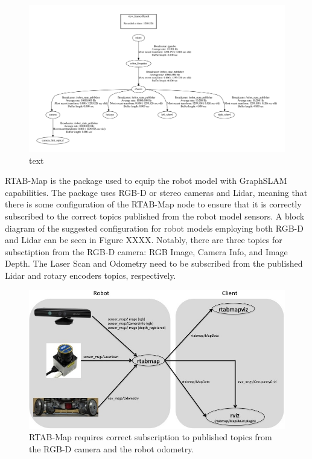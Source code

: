 \documentclass[a4paper]{article}
\begin{document}
\clearpage

\begin{figure}
	\centering
	\includegraphics[scale=0.5]{frames}
	\caption{text}
\end{figure}

\clearpage

RTAB-Map is the package used to equip the robot model with GraphSLAM capabilities. The package uses RGB-D or stereo cameras and Lidar, meaning that there is some configuration of the RTAB-Map node to ensure that it is correctly subscribed to the correct topics published from the robot model sensors. A block diagram of the suggested configuration for robot models employing both RGB-D and Lidar can be seen in Figure XXXX. Notably, there are three topics for subsctiption from the RGB-D camera: RGB Image, Camera Info, and Image Depth. The Laser Scan and Odometry need to be subscribed from the published Lidar and rotary encoders topics, respectively.\\

\begin{figure}[h]
	\centering
	\includegraphics[scale=0.5]{rtabmap_setup}
	\caption{RTAB-Map requires correct subscription to published topics from the RGB-D camera and the robot odometry.}
\end{figure}
\end{document}
